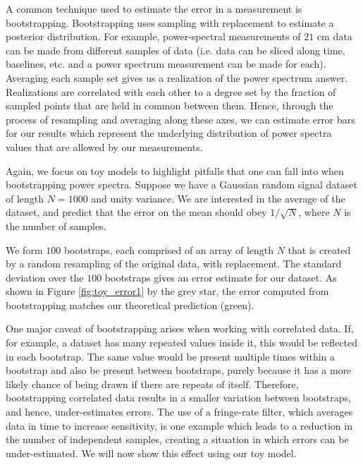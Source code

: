 \documentclass[preprint2,numberedappendix,tighten]{aastex6}  %
\begin{document}
A common technique used to estimate the error in a measurement is bootstrapping. Bootstrapping uses sampling with replacement to estimate a posterior distribution. For example, power-spectral measurements of $21$ cm data can be made from different samples of data (i.e. data can be sliced along time, baselines, etc. and a power spectrum measurement can be made for each). Averaging each sample set gives us a realization of the power spectrum answer. Realizations are correlated with each other to a degree set by the fraction of sampled points that are held in common between them. Hence, through the process of resampling and averaging along these axes, we can estimate error bars for our results which represent the underlying distribution of power spectra values that are allowed by our measurements.

Again, we focus on toy models to highlight pitfalls that one can fall into when bootstrapping power spectra. Suppose we have a Gaussian random signal dataset of length $N=1000$ and unity variance. We are interested in the average of the dataset, and predict that the error on the mean should obey $1/\sqrt{N}$, where $N$ is the number of samples.

We form $100$ bootstraps, each comprised of an array of length $N$ that is created by a random resampling of the original data, with replacement. The standard deviation over the $100$ bootstraps gives an error estimate for our dataset. As shown in Figure \ref{fig:toy_error1} by the grey star, the error computed from bootstrapping matches our theoretical prediction (green).

One major caveat of bootstrapping arises when working with correlated data. If, for example, a dataset has many repeated values inside it, this would be reflected in each bootstrap. The same value would be present multiple times within a bootstrap and also be present between bootstraps, purely because it has a more likely chance of being drawn if there are repeats of itself. Therefore, bootstrapping correlated data results in a smaller variation between bootstraps, and hence, under-estimates errors. The use of a fringe-rate filter, which averages data in time to increase sensitivity, is one example which leads to a reduction in the number of independent samples, creating a situation in which errors can be under-estimated. We will now show this effect using our toy model.
\end{document}
